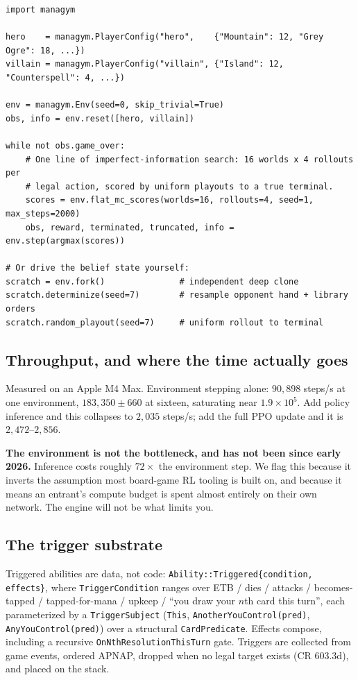 \documentclass[11pt]{article}
\begin{document}
\begin{lstlisting}[caption={The whole imperfect-information API. Signatures are current as of this draft.}]
import managym

hero    = managym.PlayerConfig("hero",    {"Mountain": 12, "Grey Ogre": 18, ...})
villain = managym.PlayerConfig("villain", {"Island": 12, "Counterspell": 4, ...})

env = managym.Env(seed=0, skip_trivial=True)
obs, info = env.reset([hero, villain])

while not obs.game_over:
    # One line of imperfect-information search: 16 worlds x 4 rollouts per
    # legal action, scored by uniform playouts to a true terminal.
    scores = env.flat_mc_scores(worlds=16, rollouts=4, seed=1, max_steps=2000)
    obs, reward, terminated, truncated, info = env.step(argmax(scores))

# Or drive the belief state yourself:
scratch = env.fork()               # independent deep clone
scratch.determinize(seed=7)        # resample opponent hand + library orders
scratch.random_playout(seed=7)     # uniform rollout to terminal
\end{lstlisting}

\subsection{Throughput, and where the time actually goes}

Measured on an Apple M4 Max. Environment stepping alone: $90{,}898$ steps/s at one environment, $183{,}350\pm660$ at sixteen, saturating near $1.9\times10^{5}$. Add policy inference and this collapses to $2{,}035$ steps/s; add the full PPO update and it is $2{,}472$--$2{,}856$.

\textbf{The environment is not the bottleneck, and has not been since early 2026.} Inference costs roughly $72\times$ the environment step. We flag this because it inverts the assumption most board-game RL tooling is built on, and because it means an entrant's compute budget is spent almost entirely on their own network. The engine will not be what limits you.

\subsection{The trigger substrate}
\label{sec:triggers}

Triggered abilities are data, not code: \texttt{Ability::Triggered\{condition, effects\}}, where \texttt{TriggerCondition} ranges over ETB / dies / attacks / becomes-tapped / tapped-for-mana / upkeep / ``you draw your $n$th card this turn'', each parameterized by a \texttt{TriggerSubject} (\texttt{This}, \texttt{AnotherYouControl(pred)}, \texttt{AnyYouControl(pred)}) over a structural \texttt{CardPredicate}. Effects compose, including a recursive \texttt{OnNthResolutionThisTurn} gate. Triggers are collected from game events, ordered APNAP, dropped when no legal target exists (CR 603.3d), and placed on the stack.
\end{document}
